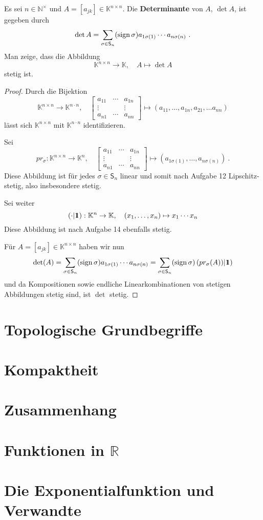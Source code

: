 \setcounter{aufgabe}{15}
\begin{aufgabe}
	Es sei $n \in \mathbb N^\times$ und $A = [a_{jk}] \in \mathbb K^{n \times n}$.
	Die \textbf{Determinante} von $A$, $\det A$, ist gegeben durch
	\[
		\det A = \sum_{\sigma \in \mathsf S_n} (\operatorname{sign} \sigma) a_{1 \sigma(1)} \cdots 
			a_{n \sigma(n)} \ .
	\]
	Man zeige, dass die Abbildung
	\[
		\mathbb K^{n \times n}  \to \mathbb K, \quad A \mapsto \det A
	\]
	stetig ist.
\end{aufgabe}
\begin{proof}
	Durch die Bijektion
	\[
		\mathbb K^{n \times n} \to \mathbb K^{n \cdot n}, \quad
		\begin{bmatrix} a_{11} & \cdots & a_{1n} \\
			\vdots & & \vdots \\
			a_{n1} & \cdots & a_{nn}
		\end{bmatrix}
		\mapsto
		(a_{11}, \ldots, a_{1n}, a_{21}, \ldots a_{nn} )
	\]
	lässt sich $\mathbb K^{n \times n}$ mit $\mathbb K^{n \cdot n}$
	identifizieren.

	Sei
	\[
		pr_\sigma: \mathbb K^{n \times n} \to \mathbb K^n, \quad
		\begin{bmatrix} a_{11} & \cdots & a_{1n} \\
			\vdots & & \vdots \\
			a_{n1} & \cdots & a_{nn}
		\end{bmatrix}
		\mapsto
		(a_{1\sigma(1)}, \ldots, a_{n \sigma(n)}) \ .
	\]
	Diese Abbildung ist für jedes $\sigma \in \mathsf S_n$ linear und somit nach Aufgabe
	12 Lipschitz-stetig, also insbesondere stetig.

	Sei weiter 
	\[
		( \cdot | \bbone ): \mathbb K^n \to \mathbb K, \quad
		(x_1, \ldots, x_n) \mapsto x_1 \cdots x_n
	\]
	Diese Abbildung ist nach Aufgabe 14 ebenfalls stetig.

	Für $A = [a_{jk}] \in \mathbb K^{n \times n}$ haben wir nun
	\[
		\det(A) = \sum_{\sigma \in \mathsf S_n} (\sign \sigma) a_{1 \sigma(1)} \cdots a_{n \sigma(n)}
			= \sum_{ \sigma \in \mathsf S_n} (\sign \sigma) \left( pr_\sigma(A)) | \bbone \right)
	\]
	und da Kompositionen sowie endliche Linearkombinationen von stetigen Abbildungen stetig sind,
	ist $\det$ stetig.

\end{proof}


\section{Topologische Grundbegriffe}
\section{Kompaktheit}
\section{Zusammenhang}
\section{Funktionen in $\mathbb R$}
\section{Die Exponentialfunktion und Verwandte}
